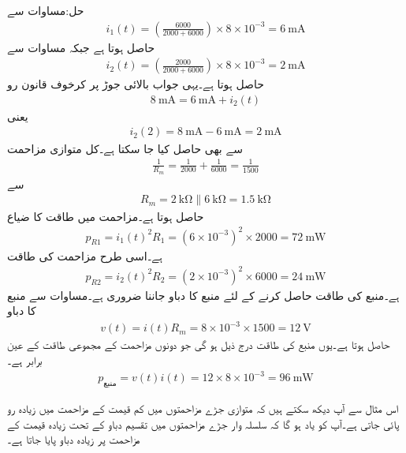 حل:مساوات  سے
\begin{align*}
i_1(t)=\left(\frac{6000}{2000+6000}\right)  \times 8\times 10^{-3} =\SI{6}{\milli\ampere}
\end{align*}
حاصل ہوتا ہے جبکہ مساوات  سے
\begin{align*}
i_2(t)=\left(\frac{2000}{2000+6000}\right) \times 8\times 10^{-3}=\SI{2}{\milli\ampere}
\end{align*}
حاصل ہوتا ہے۔یہی جواب بالائی جوڑ پر کرخوف قانون رو
\begin{align*}
\SI{8}{\milli\ampere}=\SI{6}{\milli\ampere}+i_2(t)
\end{align*}
یعنی
\begin{align*}
i_2(2)=\SI{8}{\milli\ampere}-\SI{6}{\milli\ampere}=\SI{2}{\milli\ampere}
\end{align*}
سے بھی حاصل کیا جا سکتا ہے۔کل متوازی مزاحمت
\begin{align*}
\frac{1}{R_m}=\frac{1}{2000}+\frac{1}{6000}=\frac{1}{1500}
\end{align*}
سے 
\begin{align*}
R_m=\SI{2}{\kilo\ohm} \parallel \SI{6}{\kilo\ohm}=\SI{1.5}{\kilo\ohm}
\end{align*}
حاصل ہوتا ہے۔مزاحمت  میں طاقت کا ضیاع
\begin{align*}
p_{R1}=i_1(t)^2 R_1=(6\times 10^{-3})^2  \times 2000=\SI{72}{\milli\watt}
\end{align*}
ہے۔اسی طرح مزاحمت  کی طاقت
\begin{align*}
p_{R2}=i_2(t)^2 R_2=(2\times 10^{-3})^2  \times 6000=\SI{24}{\milli\watt}
\end{align*}
ہے۔منبع کی طاقت حاصل کرنے کے لئے منبع کا دباو جاننا ضروری ہے۔مساوات  سے  منبع کا دباو
\begin{align*}
v(t)=i(t) R_m=8\times 10^{-3}\times 1500=\SI{12}{\volt} 
\end{align*}
حاصل ہوتا ہے۔یوں منبع کی طاقت درج ذیل ہو گی جو دونوں مزاحمت کے مجموعی طاقت کے  عین برابر ہے۔
\begin{align*}
p_{\text{منبع}}=v(t) i(t)=12\times 8\times 10^{-3}=\SI{96}{\milli\watt}
\end{align*}

اس مثال سے آپ دیکھ سکتے ہیں کہ متوازی جڑے مزاحمتوں میں کم قیمت کے مزاحمت میں زیادہ رو پائی جاتی ہے۔آپ کو یاد ہو گا کہ سلسلہ وار جڑے مزاحمتوں میں تقسیم دباو کے تحت زیادہ قیمت کے مزاحمت پر زیادہ دباو پایا جاتا ہے۔


